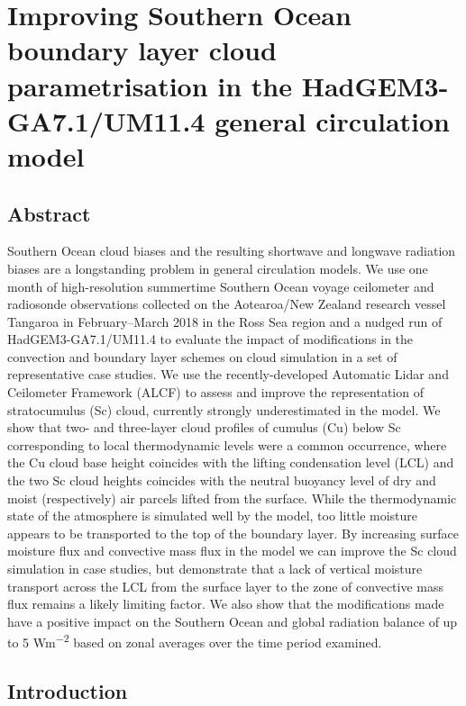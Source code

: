 \chapter{Improving Southern Ocean boundary layer cloud parametrisation in the HadGEM3-GA7.1/UM11.4 general circulation model}

\section*{Abstract}

Southern Ocean cloud biases and the resulting shortwave and longwave radiation
biases are a longstanding problem in general circulation models. We use one month of high-resolution summertime
Southern Ocean voyage ceilometer and radiosonde observations collected on the Aotearoa/New Zealand research vessel Tangaroa in February--March
2018 in the Ross Sea region
and a nudged run of HadGEM3-GA7.1/UM11.4 to
evaluate the impact of modifications in the convection and boundary layer
schemes on cloud simulation in a set of representative case studies. We use the recently-developed Automatic Lidar and Ceilometer Framework (ALCF) to assess and improve the representation of stratocumulus (Sc) cloud,
currently strongly underestimated in the model. We show that two- and three-layer cloud
profiles of cumulus (Cu) below Sc corresponding to local thermodynamic levels were a common occurrence, where
the Cu cloud base height coincides with the lifting condensation level (LCL)
and the two Sc cloud heights coincides with the neutral buoyancy level of dry and moist (respectively) air
parcels lifted from the surface.
While the thermodynamic state of the atmosphere is simulated
well by the model, too little moisture appears to be transported to the top of the boundary layer. By increasing surface moisture flux and convective mass flux in the model we can improve the Sc cloud simulation in case studies, but demonstrate that a lack of vertical moisture transport
across the LCL from the surface layer to the zone of convective mass flux remains a likely limiting factor.
We also show that the modifications made have a positive impact on the Southern Ocean and
global radiation balance of up to 5 \unit{Wm^{-2}} based on zonal averages over the time period examined.


\section{Introduction}

